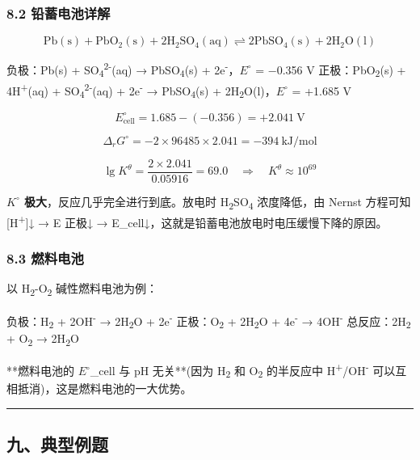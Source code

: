\documentclass[a4paper,11pt]{ctexart}
\begin{document}
\subsubsection{8.2 铅蓄电池详解}\label{ux94c5ux84c4ux7535ux6c60ux8be6ux89e3}

\[
\mathrm{Pb(s) + PbO_2(s) + 2H_2SO_4(aq) \rightleftharpoons 2PbSO_4(s) + 2H_2O(l)}
\]

负极：Pb(s) + SO\textsubscript{4}\textsuperscript{2-}(aq) → PbSO\textsubscript{4}(s) + 2e\textsuperscript{-}，\(E^{\circ}\) = −0.356 V
正极：PbO\textsubscript{2}(s) + 4H\textsuperscript{+}(aq) + SO\textsubscript{4}\textsuperscript{2-}(aq) + 2e\textsuperscript{-} → PbSO\textsubscript{4}(s) + 2H\textsubscript{2}O(l)，\(E^{\circ}\) = +1.685 V

\[E^\circ_{\text{cell}} = 1.685 - (-0.356) = +2.041\ \mathrm{V}\]

\[\Delta_rG^\circ = -2 \times 96485 \times 2.041 = -394\ \mathrm{kJ/mol}\]

\[\lg K^\theta = \frac{2 \times 2.041}{0.05916} = 69.0 \quad \Rightarrow \quad K^\theta \approx 10^{69}\]

\textbf{\(K^{\circ}\) 极大}，反应几乎完全进行到底。放电时 H\textsubscript{2}SO\textsubscript{4} 浓度降低，由 Nernst 方程可知 {[}H\textsuperscript{+}{]}↓ → E 正极↓ → E\_cell↓，这就是铅蓄电池放电时电压缓慢下降的原因。

\subsubsection{8.3 燃料电池}\label{ux71c3ux6599ux7535ux6c60}

以 H\textsubscript{2}-O\textsubscript{2} 碱性燃料电池为例：

负极：H\textsubscript{2} + 2OH\textsuperscript{-} → 2H\textsubscript{2}O + 2e\textsuperscript{-}
正极：O\textsubscript{2} + 2H\textsubscript{2}O + 4e\textsuperscript{-} → 4OH\textsuperscript{-}
总反应：2H\textsubscript{2} + O\textsubscript{2} → 2H\textsubscript{2}O

**燃料电池的 \(E^{\circ}\)\_cell 与 pH 无关**(因为 H\textsubscript{2} 和 O\textsubscript{2} 的半反应中 H\textsuperscript{+}/OH\textsuperscript{-} 可以互相抵消)，这是燃料电池的一大优势。

\begin{center}\rule{0.5\linewidth}{0.5pt}\end{center}

\subsection{九、典型例题}\label{ux4e5dux5178ux578bux4f8bux9898}
\end{document}
